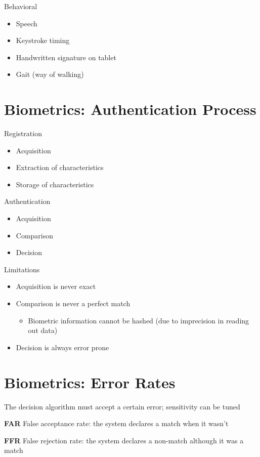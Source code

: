\documentclass[11pt]{article}
\begin{document}
Behavioral
\begin{itemize}
	\item Speech
	\item Keystroke timing
	\item Handwritten signature on tablet
	\item Gait (way of walking)
\end{itemize}


\section*{Biometrics: Authentication Process}

Registration 
\begin{itemize}
	\item Acquisition
	\item Extraction of characteristics
	\item Storage of characteristics
\end{itemize}

Authentication
\begin{itemize}
	\item Acquisition
	\item Comparison
	\item Decision
\end{itemize}

Limitations
\begin{itemize}
	\item Acquisition is never exact
	\item Comparison is never a perfect match
		\begin{itemize}
			\item Biometric information cannot be hashed (due to imprecision in reading out data)
		\end{itemize}
	\item Decision is always error prone
\end{itemize}

\section*{Biometrics: Error Rates}

The decision algorithm must accept a certain error; sensitivity can be tuned

\textbf{FAR} False acceptance rate: the system declares a match when it wasn't 

\textbf{FFR} False rejection rate: the system declares a non-match although it was a match
\end{document}
